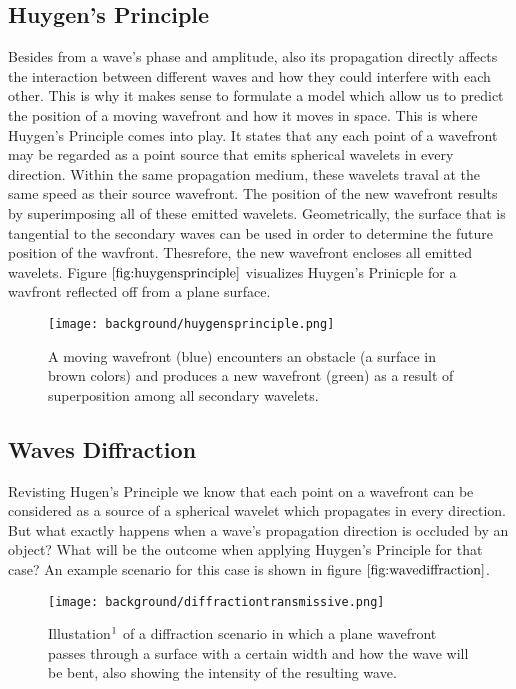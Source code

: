\subsection{Huygen's Principle}
Besides from a wave's phase and amplitude, also its propagation directly affects the interaction between different waves and how they could interfere with each other. This is why it makes sense to formulate a model which allow us to predict the position of a moving wavefront and how it moves in space. This is where Huygen's Principle comes into play. It states that any each point of a wavefront may be regarded as a point source that emits spherical wavelets in every direction. Within the same propagation medium, these wavelets traval at the same speed as their source wavefront. The position of the new wavefront results by superimposing all of these emitted wavelets. Geometrically, the surface that is tangential to the secondary waves can be used in order to determine the future position of the wavfront. Thesrefore, the new wavefront encloses all emitted wavelets. Figure $\ref{fig:huygensprinciple}$ visualizes Huygen's Prinicple for a wavfront reflected off from a plane surface.

\begin{figure}[H]
  \centering
  \texttt{[image: background/huygensprinciple.png]}
  \caption[Huygen's Principle]{A moving wavefront (blue) encounters an obstacle (a surface in brown colors) and produces a new wavefront (green) as a result of superposition among all secondary wavelets.}
  \label{fig:huygensprinciple}
\end{figure}

\subsection{Waves Diffraction}
Revisting Hugen's Principle we know that each point on a wavefront can be considered as a source of a spherical wavelet which propagates in every direction. But what exactly happens when a wave's propagation direction is occluded by an object? What will be the outcome when applying Huygen's Principle for that case? An example scenario for this case is shown in figure $\ref{fig:wavediffraction}$. 

\begin{figure}[H]
  \centering
  \texttt{[image: background/diffractiontransmissive.png]}
  \caption[Diffracted Wave]{Illustation$\footnotemark$ of a diffraction scenario in which a plane wavefront passes through a surface with a certain width and how the wave will be bent, also showing the intensity of the resulting wave.}
  \label{fig:wavediffraction}
\end{figure}

